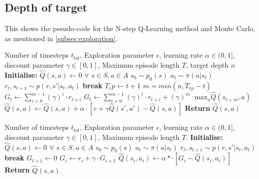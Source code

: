 \documentclass{article}
\theoremstyle{plain}
\theoremstyle{definition}
\theoremstyle{remark}
\begin{document}
{\subsection{Depth of target}
This shows the pesudo-code for the N-step Q-Learning method and Monte Carlo, as mentioned in \autoref{subsec:exploration}.
\begin{algorithm}[H]
\caption{N-step Q-learning}
\label{alg:N_step_q_learning}
\begin{algorithmic}
     Number of timesteps $t_{tot}$, Exploration parameter $\epsilon$, learning rate $\alpha\in(0,1]$, discount parameter $\gamma\in[0,1]$, Maximum episode length $T$, target depth $n$
   \STATE \textbf{Initialise:} $\hat{Q}(s,a)\leftarrow0$ $\forall$ $s\in S, a\in A$
    \STATE $s_0\sim p_0(s)$
    \STATE $a_t\sim \pi(a|s_t)$
    \STATE $r_t, s_{t+1}\sim p(r, s'|s_t, a_t)$
    \STATE \textbf{break}
    \ENDIF
    \ENDFOR
    \STATE $T_ep \leftarrow t+1$
    \STATE $m=min(n, T_{ep}-t)$
    \STATE $G_t\leftarrow\sum^{m-1}_{i=0}(\gamma)^i\cdot r_{t+i}$
    \ELSE
    \STATE $G_t\leftarrow\sum^{m-1}_{i=0}(\gamma)^i\cdot r_{t+i}+(\gamma)^m \cdot \text{max}_a \hat{Q}(s_{t+m}, a)$
    \ENDIF
    \STATE $\hat{Q}(s, a) \leftarrow \hat{Q}(s, a) + \alpha\cdot[r+\gamma \hat{Q}(s', a')-\hat{Q}(s, a)]$
    \ENDFOR
    \ENDWHILE
    \STATE \textbf{Return} $\hat{Q}(s, a)$
\end{algorithmic}
\end{algorithm}

\begin{algorithm}[H]
\caption{Tabular Monte Carlo RL}
\label{alg:Monte_Carlo}
\begin{algorithmic}
     Number of timesteps $t_{tot}$, Exploration parameter $\epsilon$, learning rate $\alpha\in(0,1]$, discount parameter $\gamma\in[0,1]$, Maximum episode length $T$.
    \STATE \textbf{Initialise:} $\hat{Q}(s,a)\leftarrow0$ $\forall$ $s\in S, a\in A$
    \STATE $s_0\sim p_0(s)$
    \STATE $a_t\sim \pi(a|s_t)$
    \STATE $r_t, s_{t+1}\sim p(r, s'|s_t, a_t)$
    \STATE \textbf{break}
    \ENDIF
    \ENDFOR
    \STATE $G_{t+1} \leftarrow 0$
    \STATE $G_i\leftarrow r_i+\gamma\cdot G_{i+1}$
    \STATE $\hat{Q}(s_i, a_i)\leftarrow\alpha*\cdot[G_i-\hat{Q}(s_i, a_i)]$
    \ENDFOR
    \ENDWHILE
    \STATE \textbf{Return} $\hat{Q}(s, a)$
\end{algorithmic}
\end{algorithm}

}
\end{document}
